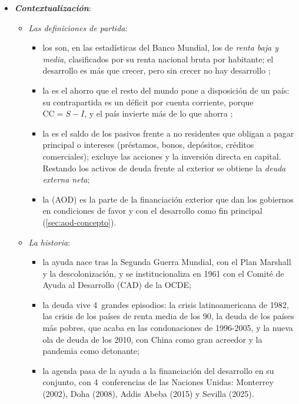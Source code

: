 \documentclass[11pt]{article}
\begin{document}
\begin{itemize}
\item \textbf{\emph{Contextualización}}:
  \begin{itemize}
  \item \emph{Las definiciones de partida}:
    \begin{itemize}
    \item los  son, en las estadísticas del Banco Mundial, los de \emph{renta baja y media}, clasificados por su renta nacional bruta por habitante; el desarrollo es más que crecer, pero sin crecer no hay desarrollo ;
    \item la  es el ahorro que el resto del mundo pone a disposición de un país: su contrapartida es un déficit por cuenta corriente, porque $\mathrm{CC}=S-I$, y el país invierte más de lo que ahorra ;
    \item la  es el saldo de los pasivos frente a no residentes que obligan a pagar principal o intereses (préstamos, bonos, depósitos, créditos comerciales); excluye las acciones y la inversión directa en capital\nocite{FMI2014DeudaExterna}. Restando los activos de deuda frente al exterior se obtiene la \emph{deuda externa neta};
    \item la  (AOD) es la parte de la financiación exterior que dan los gobiernos en condiciones de favor y con el desarrollo como fin principal (\ref{sec:aod-concepto}).
    \end{itemize}
  \item \emph{La historia}:
    \begin{itemize}
    \item la ayuda nace tras la Segunda Guerra Mundial, con el Plan Marshall y la descolonización, y se institucionaliza en 1961 con el Comité de Ayuda al Desarrollo (CAD) de la OCDE;
    \item la deuda vive 4~grandes episodios: la crisis latinoamericana de 1982, las crisis de los países de renta media de los 90, la deuda de los países más pobres, que acaba en las condonaciones de 1996-2005, y la nueva ola de deuda de los 2010, con China como gran acreedor y la pandemia como detonante;
    \item la agenda pasa de la ayuda a la financiación del desarrollo en su conjunto, con 4~conferencias de las Naciones Unidas: Monterrey (2002), Doha (2008), Addis Abeba (2015) y Sevilla (2025).
    \end{itemize}
  \end{itemize}


\end{itemize}
\end{document}
